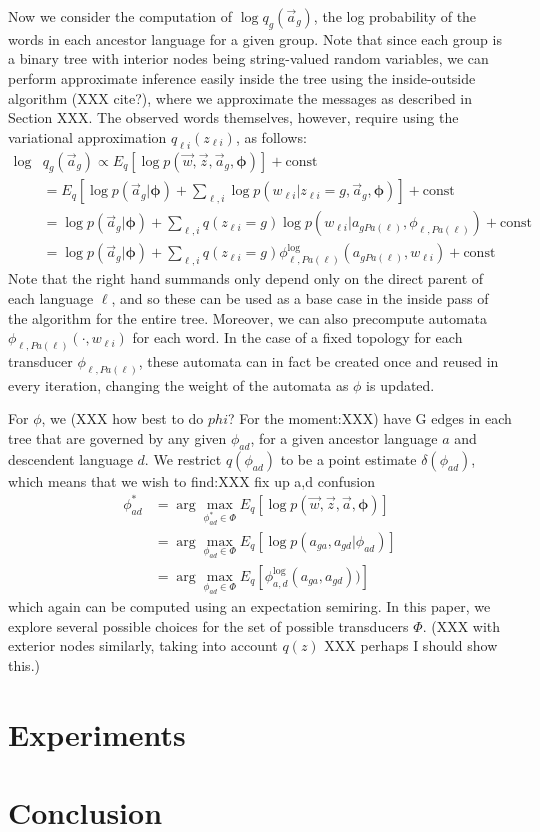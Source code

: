 \documentclass[11pt]{article}
\begin{document}
Now we consider the computation of $\log q_g(\vec a_g)$, the log
probability of the words in each ancestor language for a given
group. Note that since each group is a binary tree with interior
nodes being string-valued random variables, we can perform approximate inference
easily inside the tree using the inside-outside algorithm (XXX
cite?), where we approximate the messages as described in Section XXX.
The observed words themselves, however, require using the
variational approximation $q_{\ell i}(z_{\ell i})$, as follows:
 \begin{equation}
   \begin{split}
     \log &q_{g}(\vec a_g) \propto E_q[\log p(\vec w, \vec z, \vec a_g,\mathbf{\phi})] + \mathrm{const}\\
     &= E_q[\log p(\vec a_g|\mathbf\phi) + \sum_{\ell,i}\log p(w_{\ell i}| z_{\ell i} = g, \vec a_g,\mathbf\phi)] + \mathrm{const}\\
     &= \log p(\vec a_g|\mathbf\phi) + \sum_{\ell,i} q(z_{\ell i}=g) \log p(w_{\ell i}|a_{g Pa(\ell)},\phi_{\ell,Pa(\ell)}) + \mathrm{const}\\
     &= \log p(\vec a_g|\mathbf\phi) + \sum_{\ell,i} q(z_{\ell i}=g) \phi_{\ell,Pa(\ell)}^{\log}(a_{g Pa(\ell)},w_{\ell i}) + \mathrm{const}
    \end{split}
  \end{equation}
Note that the right hand summands only depend only on the direct
parent of each language $\ell$, and so these can be used as a base
case in the inside pass of the algorithm for the entire tree.
Moreover, we can also precompute automata
$\phi_{\ell,Pa(\ell)}(\cdot,w_{\ell i})$ for each word. In the case
of a fixed topology for each transducer $\phi_{\ell,Pa(\ell)}$, these automata can
in fact be created once and reused in every iteration, changing
the weight of the automata as $\phi$ is updated.

For $\phi$, we (XXX how best to do $phi$? For the moment:XXX) have
G edges in each tree that are governed by any given $\phi_{ad}$,
for a given ancestor language $a$ and descendent language $d$. We
restrict $q(\phi_{ad})$ to be a point estimate $\delta(\phi_{ad})$,
which means that we wish to find:XXX fix up a,d confusion
\begin{equation}
  \begin{split}
    \phi_{ad}^* &= \arg\max_{\phi_{ad}^* \in \Phi} E_q[\log p(\vec w, \vec z, \vec a,\mathbf{\phi})] \\
    &= \arg\max_{\phi_{ad} \in \Phi} E_q[\log p(a_{ga},a_{gd}|\phi_{ad})]\\
    &= \arg\max_{\phi_{ad} \in \Phi} E_q[\phi^{\log}_{a,d}(a_{ga},a_{gd}))]
   \end{split}
 \end{equation}
which again can be computed using an expectation semiring. In this
paper, we explore several possible choices for the set of possible
transducers $\Phi$.
 (XXX with exterior nodes similarly, taking into account $q(z)$ XXX perhaps I should show this.)
\section{Experiments}
\section{Conclusion}
\end{document}
